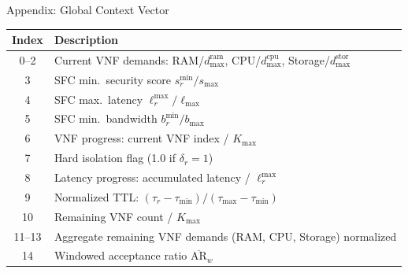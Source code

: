 \begin{frame}[noframenumbering]{Appendix: Global Context Vector}
  \centering\footnotesize
  \begin{tabular}{cp{9cm}}
    \toprule
    \textbf{Index} & \textbf{Description}\\
    \midrule
    0--2  & Current VNF demands: RAM/$d_{\max}^{\text{ram}}$, CPU/$d_{\max}^{\text{cpu}}$, Storage/$d_{\max}^{\text{stor}}$\\
    3     & SFC min.\ security score $s_r^{\min}/s_{\max}$\\
    4     & SFC max.\ latency $\ell_r^{\max}/\ell_{\max}$\\
    5     & SFC min.\ bandwidth $b_r^{\min}/b_{\max}$\\
    6     & VNF progress: current VNF index / $K_{\max}$\\
    7     & Hard isolation flag (1.0 if $\delta_r=1$)\\
    8     & Latency progress: accumulated latency / $\ell_r^{\max}$\\
    9     & Normalized TTL: $(\tau_r-\tau_{\min})/(\tau_{\max}-\tau_{\min})$\\
    10    & Remaining VNF count / $K_{\max}$\\
    11--13& Aggregate remaining VNF demands (RAM, CPU, Storage) normalized\\
    14    & Windowed acceptance ratio $\overline{\mathrm{AR}}_w$\\
    \bottomrule
  \end{tabular}
\end{frame}
